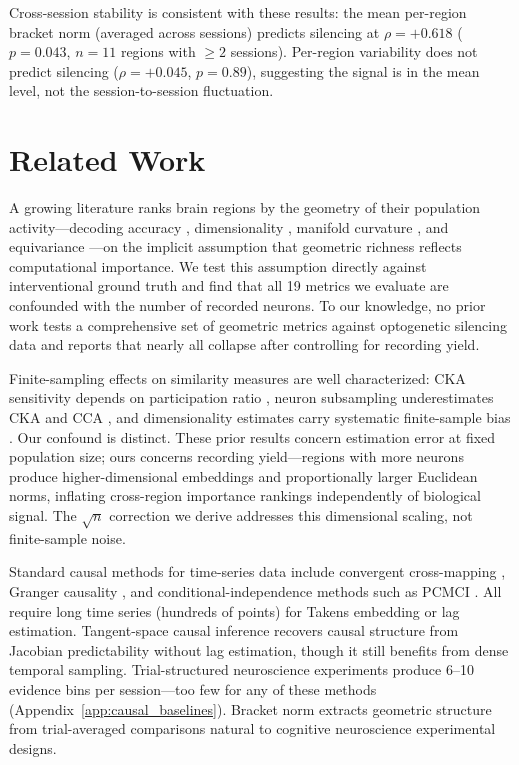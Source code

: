 \documentclass{article}
\begin{document}
Cross-session stability is consistent with these results: the mean per-region bracket norm (averaged across sessions) predicts silencing at $\rho = +0.618$ ($p = 0.043$, $n = 11$ regions with $\geq 2$ sessions). Per-region variability does not predict silencing ($\rho = +0.045$, $p = 0.89$), suggesting the signal is in the mean level, not the session-to-session fluctuation.

\section{Related Work}

A growing literature ranks brain regions by the geometry of their population activity---decoding accuracy \citep{steinmetz2019distributed}, dimensionality \citep{cunningham2014dimensionality, stringer2019high}, manifold curvature \citep{gardner2022toroidal}, and equivariance \citep{ostrow2023beyond}---on the implicit assumption that geometric richness reflects computational importance. We test this assumption directly against interventional ground truth and find that all 19 metrics we evaluate are confounded with the number of recorded neurons. To our knowledge, no prior work tests a comprehensive set of geometric metrics against optogenetic silencing data and reports that nearly all collapse after controlling for recording yield.

Finite-sampling effects on similarity measures are well characterized: CKA sensitivity depends on participation ratio \citep{harvey2024representational}, neuron subsampling underestimates CKA and CCA \citep{murphy2024biased}, and dimensionality estimates carry systematic finite-sample bias \citep{chung2026dimensionality, spectral2025neurips}. Our confound is distinct. These prior results concern estimation error at fixed population size; ours concerns recording yield---regions with more neurons produce higher-dimensional embeddings and proportionally larger Euclidean norms, inflating cross-region importance rankings independently of biological signal. The $\sqrt{n}$ correction we derive addresses this dimensional scaling, not finite-sample noise.

Standard causal methods for time-series data include convergent cross-mapping \citep{sugihara2012detecting}, Granger causality \citep{granger1969investigating}, and conditional-independence methods such as PCMCI \citep{runge2019detecting}. All require long time series (hundreds of points) for Takens embedding or lag estimation. Tangent-space causal inference \citep{butler2024tsci} recovers causal structure from Jacobian predictability without lag estimation, though it still benefits from dense temporal sampling. Trial-structured neuroscience experiments produce 6--10 evidence bins per session---too few for any of these methods (Appendix~\ref{app:causal_baselines}). Bracket norm extracts geometric structure from trial-averaged comparisons natural to cognitive neuroscience experimental designs.
\end{document}
